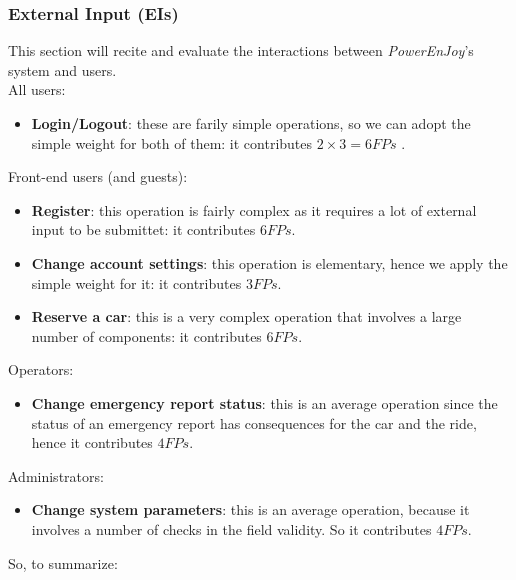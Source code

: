 \subsubsection{External Input (EIs)}
This section will recite and evaluate the interactions between \textit{PowerEnJoy}'s system and users. \\

All users:\\
	\begin{itemize}
		\item \textbf{Login/Logout}: these are farily simple operations, so we can adopt the simple weight for both of them: it contributes $2\times3=6 FPs$ .
	\end{itemize}

Front-end users (and guests):\\ %
	\begin{itemize}
		\item \textbf{Register}: this operation is fairly complex as it requires a lot of external input to be submittet: it contributes $6 FPs$.
		\item \textbf{Change account settings}: this operation is elementary, hence we apply the simple weight for it: it contributes $3 FPs$.
		\item \textbf{Reserve a car}: this is a very complex operation that involves a large number of components: it contributes $6 FPs$.
	\end{itemize}

Operators:\\
	\begin{itemize}
		\item \textbf{Change emergency report status}: this is an average operation since the status of an emergency report has consequences for the car and the ride, hence it contributes $4 FPs$.
	\end{itemize}

Administrators:\\
	\begin{itemize}
		\item \textbf{Change system parameters}: this is an average operation, because it involves a number of checks in the field validity. So it contributes $4 FPs$.
	\end{itemize}

So, to summarize: \\

